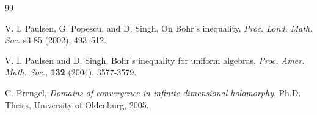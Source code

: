 \documentclass[a4paper,12pt]{amsart}
\theoremstyle{definition}
\begin{document}
\begin{thebibliography}{99}
	
	
	
	
	
	
	 {\sc V. I. Paulsen, G. Popescu}, and {\sc D. Singh}, On Bohr's inequality, {\it Proc. Lond. Math. Soc.} s3-85 (2002), 493--512.
	
	 {\sc V. I. Paulsen} and {\sc D. Singh}, Bohr’s inequality for uniform algebras, {\it Proc. Amer. Math. Soc.}, {\bf 132} (2004), 3577-3579.
	
	 {\sc C. Prengel}, {\it Domains of convergence in infinite dimensional holomorphy}, Ph.D. Thesis, University of Oldenburg, 2005.
	
	
	

\end{thebibliography}
\end{document}
